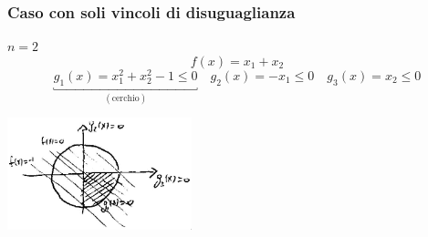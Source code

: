 \subsubsection{Caso con soli vincoli di disuguaglianza}
\begin{example}
$n = 2$
$$ f(x) = x_1 + x_2$$
$$ \underbracket{g_1(x) = x_1^{2} + x_2^{2} -1 \leq 0
}_{(\text{cerchio})}
\quad g_2(x) = -x_1 \leq 0
\quad g_3(x) = x_2 \leq 0
$$
\begin{center}
\includegraphics[width=0.4\textwidth]{imgs/ottvinc01.png}
\end{center}


\end{example}
